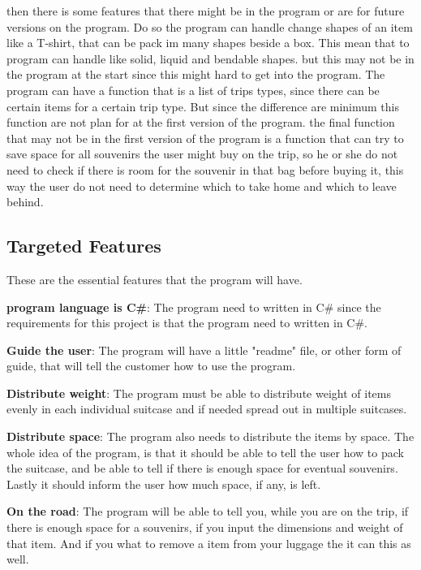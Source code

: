 then there is some features that there might be in the program or are for future versions on the program. Do so the program can handle change shapes of an item like a T-shirt, that can be pack im many shapes beside a box. This mean that to program can handle like solid, liquid and bendable shapes. but this may not be in the program at the start since this might hard to get into the program.
The program can have a function that is a list of trips types, since there can be certain items for a certain trip type. But since the difference are minimum this function are not plan for at the first version of the program.
the final function that may not be in the first version of the program is a function that can try to save space for all souvenirs the user might buy on the trip, so he or she do not need to check if there is room for the souvenir in that bag before buying it, this way the user do not need to determine which to take home and which to leave behind.

\subsection{Targeted Features}
These are the essential features that the program will have.\newline

\textbf{program language is C#}:
The program need to written in C# since the requirements for this project is that the program need to written in C#.

\textbf{Guide the user}:
The program will have a little "readme" file, or other form of guide, that will tell the customer how to use the program.
\newline

\textbf{Distribute weight}:
The program must be able to distribute weight of items evenly in each individual suitcase and if needed spread out in multiple suitcases.
\newline

\textbf{Distribute space}:
The program also needs to distribute the items by space. The whole idea of the program, is that it should be able to tell the user how to pack the suitcase, and be able to tell if there is enough space for eventual souvenirs. Lastly it should inform the user how much space, if any, is left.
\newline

\textbf{On the road}:
The program will be able to tell you, while you are on the trip, if there is enough space for a souvenirs, if you input the dimensions and weight of that item. And if you what to remove a item from your luggage the it can this as well.
\newline

